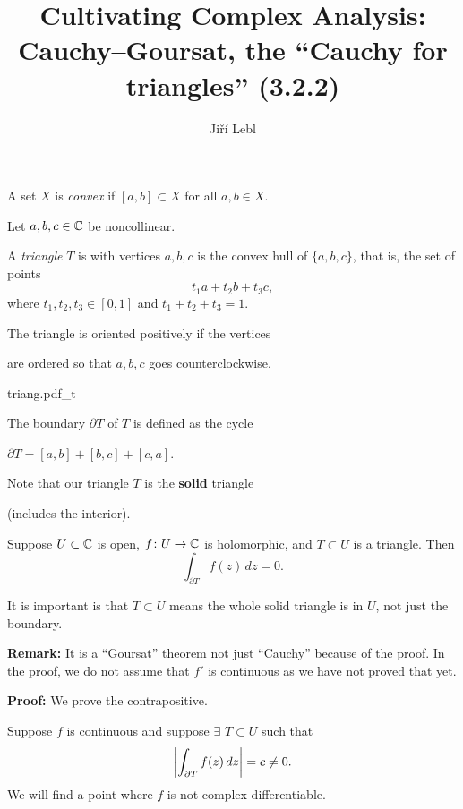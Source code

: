 \documentclass[10pt,aspectratio=169]{beamer}
\author{Ji\v{r}\'i Lebl}
\institute[OSU]{%
Departemento pri Matematiko de Oklahoma {\^S}tata Universitato}
\title{Cultivating Complex Analysis:\\%
Cauchy--Goursat, the ``Cauchy for triangles'' (3.2.2)}
\date{}
\begin{document}
\begin{frame}
\titlepage
\end{frame}

\begin{frame}
A set $X$ is \emph{convex} 
if $[a,b] \subset X$ for all $a,b \in X$.

\medskip
\pause

Let $a,b,c \in {\mathbb{C}}$ be noncollinear.

\medskip
\pause

A \emph{triangle} $T$ is with vertices $a,b,c$
is the convex hull of $\{ a,b,c \}$,
that is, the set of points
\begin{equation*}
t_1 a + t_2 b + t_3 c ,
\end{equation*}
where $t_1,t_2,t_3 \in [0,1]$ and $t_1+t_2+t_3 = 1$.

\medskip
\pause

The triangle is oriented positively if the vertices 

are ordered so that $a,b,c$ goes counterclockwise.

\vspace*{-0.4in}
\hspace*{3.1in}%
{triang.pdf_t}

\vspace*{-0.4in}
\pause

The boundary $\partial T$ of $T$ is defined as the cycle

\medskip

$\partial T = [a,b] + [b,c] + [c,a]$.

\medskip
\pause

Note that our triangle $T$ is the \textbf{solid} triangle

(includes the interior).

\end{frame}

\begin{frame}
\begin{theorem}
Suppose $U \subset {\mathbb{C}}$ is open, $f \colon U \to {\mathbb{C}}$ is
holomorphic,
and $T \subset U$ is a triangle.  Then
\[
\int_{\partial T} f(z) \, dz = 0 .
\]
\end{theorem}

\pause

It is important is that $T \subset U$ means the whole solid triangle
is in $U$, not just the boundary.

\pause
\medskip

\textbf{Remark:} It is a ``Goursat'' theorem not just ``Cauchy''
because of the proof.  In the proof, we do not assume that
$f'$ is continuous as we have not proved that yet.

\pause
\medskip

\textbf{Proof:}
We prove the contrapositive.

\medskip
\pause

Suppose $f$ is continuous and suppose $\exists$ $T \subset U$ such that
\[
\left\lvert {\int_{\partial T} f(z) \, dz} \right\rvert = c \not= 0 .
\]
\pause
We will find a point where $f$ is not complex differentiable.
\end{frame}
\end{document}
